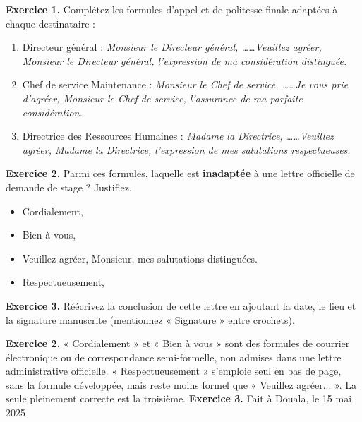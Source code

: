\documentclass[11pt]{article}
\begin{document}
\begin{exercice}
\textbf{Exercice 1.} Complétez les formules d'appel et de politesse finale adaptées à chaque destinataire :
\begin{enumerate}
\item Directeur général : \textit{Monsieur le Directeur général, \dots \quad \dots \quad Veuillez agréer, Monsieur le Directeur général, l'expression de ma considération distinguée.}
\item Chef de service Maintenance : \textit{Monsieur le Chef de service, \dots \quad \dots \quad Je vous prie d'agréer, Monsieur le Chef de service, l'assurance de ma parfaite considération.}
\item Directrice des Ressources Humaines : \textit{Madame la Directrice, \dots \quad \dots \quad Veuillez agréer, Madame la Directrice, l'expression de mes salutations respectueuses.}
\end{enumerate}
\textbf{Exercice 2.} Parmi ces formules, laquelle est \textbf{inadaptée} à une lettre officielle de demande de stage ? Justifiez.
\begin{itemize}
\item Cordialement,
\item Bien à vous,
\item Veuillez agréer, Monsieur, mes salutations distinguées.
\item Respectueusement,
\end{itemize}
\textbf{Exercice 3.} Réécrivez la conclusion de cette lettre en ajoutant la date, le lieu et la signature manuscrite (mentionnez « Signature » entre crochets).
\end{exercice}

\begin{corrige}
\textbf{Exercice 2.} « Cordialement » et « Bien à vous » sont des formules de courrier électronique ou de correspondance semi-formelle, non admises dans une lettre administrative officielle. « Respectueusement » s'emploie seul en bas de page, sans la formule développée, mais reste moins formel que « Veuillez agréer... ». La seule pleinement correcte est la troisième.
\textbf{Exercice 3.} Fait à Douala, le 15 mai 2025 \quad [Signature]
\end{corrige}
\end{document}

